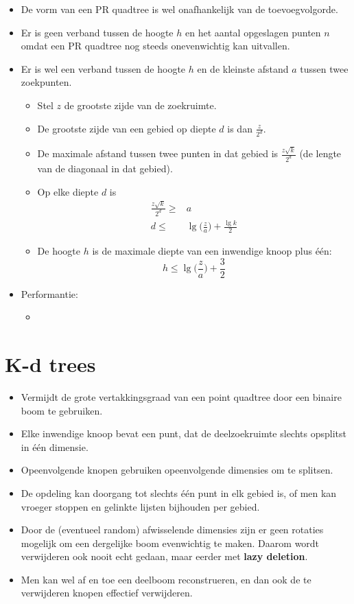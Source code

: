 \begin{itemize}
\begin{itemize}
    \end{itemize}
    \item De vorm van een PR quadtree is wel onafhankelijk van de toevoegvolgorde.
    \item Er is geen verband tussen de hoogte $h$ en het aantal opgeslagen punten $n$ omdat een PR quadtree nog steeds onevenwichtig kan uitvallen.
    \item Er is wel een verband tussen de hoogte $h$ en de kleinste afstand $a$ tussen twee zoekpunten.
    \begin{itemize}
        \item Stel $z$ de grootste zijde van de zoekruimte.
        \item De grootste zijde van een gebied op diepte $d$ is dan $\frac{z}{2^d}$. 
        \item De maximale afstand tussen twee punten in dat gebied is $\frac{z\sqrt{k}}{2^d}$ (de lengte van de diagonaal in dat gebied).
        \item Op elke diepte $d$ is 
        \begin{align*}
            \frac{z\sqrt{k}}{2^d} \geq& a \\
            d \leq& \lg\bigg(\frac{z}{a}\bigg) + \frac{\lg k}{2}
        \end{align*}
        \item De hoogte $h$ is de maximale diepte van een inwendige knoop plus één:
        $$h \leq \lg\bigg(\frac{z}{a}\bigg) + \frac{3}{2}$$
    \end{itemize}
    \item Performantie:
    \begin{itemize}
        \item {}
    \end{itemize}
\end{itemize}

\section{K-d trees}
\begin{itemize}
    \item Vermijdt de grote vertakkingsgraad van een point quadtree door een binaire boom te gebruiken.
    \item Elke inwendige knoop bevat een punt, dat de deelzoekruimte slechts opsplitst in één dimensie.
    \item Opeenvolgende knopen gebruiken opeenvolgende dimensies om te splitsen.
    \item De opdeling kan doorgang tot slechts één punt in elk gebied is, of men kan vroeger stoppen en gelinkte lijsten bijhouden per gebied.
    \item Door de (eventueel random) afwisselende dimensies zijn er geen rotaties mogelijk om een dergelijke boom evenwichtig te maken. Daarom wordt verwijderen ook nooit echt gedaan, maar eerder met \textbf{lazy deletion}.
    \item Men kan wel af en toe een deelboom reconstrueren, en dan ook de te verwijderen knopen effectief verwijderen.
\end{itemize}